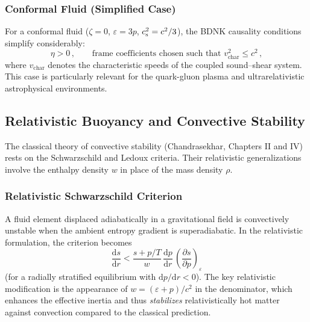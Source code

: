 \subsubsection{Conformal Fluid (Simplified Case)}
For a conformal fluid ($\zeta = 0$, $\varepsilon = 3p$,
$c_{\mathrm{s}}^{2} = c^{2}/3$), the BDNK causality conditions simplify
considerably:
\begin{equation}
  \eta > 0\,,\qquad
  \text{frame coefficients chosen such that }
  v_{\text{char}}^{2} \le c^{2}\,,
  \label{eq:BDNK-conformal}
\end{equation}
where $v_{\text{char}}$ denotes the characteristic speeds of the
coupled sound--shear system.  This case is particularly relevant for
the quark-gluon plasma and ultrarelativistic astrophysical
environments.


\subsection{Relativistic Buoyancy and Convective Stability}
\label{subsec:rel-buoyancy}

The classical theory of convective stability (Chandrasekhar, Chapters
II and IV) rests on the Schwarzschild and Ledoux criteria.  Their
relativistic generalizations involve the enthalpy density $w$ in place
of the mass density $\rho$.

\subsubsection{Relativistic Schwarzschild Criterion}
A fluid element displaced adiabatically in a gravitational field is
convectively unstable when the ambient entropy gradient is
superadiabatic.  In the relativistic formulation, the criterion
becomes
\begin{equation}
  \frac{\mathrm{d} s}{\mathrm{d} r}
  < \frac{s + p/T}{w}\,
    \frac{\mathrm{d} p}{\mathrm{d} r}\,
    \left(\frac{\partial s}{\partial p}\right)_{\!\varepsilon}
  \label{eq:rel-schwarzschild}
\end{equation}
(for a radially stratified equilibrium with $\mathrm{d} p/\mathrm{d} r < 0$).
The key relativistic modification is the appearance of $w = (\varepsilon + p)/c^{2}$
in the denominator, which enhances the effective inertia and thus
\emph{stabilizes} relativistically hot matter against convection
compared to the classical prediction.

